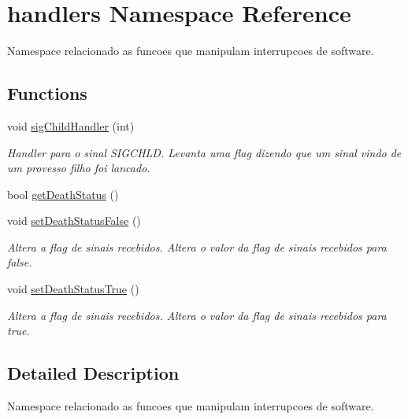 \hypertarget{namespacehandlers}{
\section{handlers Namespace Reference}
\label{namespacehandlers}
}


Namespace relacionado as funcoes que manipulam interrupcoes de software.  


\subsection*{Functions}
\begin{DoxyCompactItemize}
\item 
void \hyperlink{namespacehandlers_aa02fd1a028b7cfc01ccb52b9f70cb624}{sigChildHandler} (int)
\begin{DoxyCompactList}\small\item\em Handler para o sinal SIGCHLD. Levanta uma flag dizendo que um sinal vindo de um provesso filho foi lancado. \item\end{DoxyCompactList}\item 
bool \hyperlink{namespacehandlers_a7f732d800eb51bf0ee24d554ce770276}{getDeathStatus} ()
\item 
void \hyperlink{namespacehandlers_a254dfa6abeed4136e566fd013aa9fdc4}{setDeathStatusFalse} ()
\begin{DoxyCompactList}\small\item\em Altera a flag de sinais recebidos. Altera o valor da flag de sinais recebidos para false. \item\end{DoxyCompactList}\item 
void \hyperlink{namespacehandlers_a06dc78ff46f5dcc7fb9c09a495caf4ff}{setDeathStatusTrue} ()
\begin{DoxyCompactList}\small\item\em Altera a flag de sinais recebidos. Altera o valor da flag de sinais recebidos para true. \item\end{DoxyCompactList}\end{DoxyCompactItemize}


\subsection{Detailed Description}
Namespace relacionado as funcoes que manipulam interrupcoes de software. 

